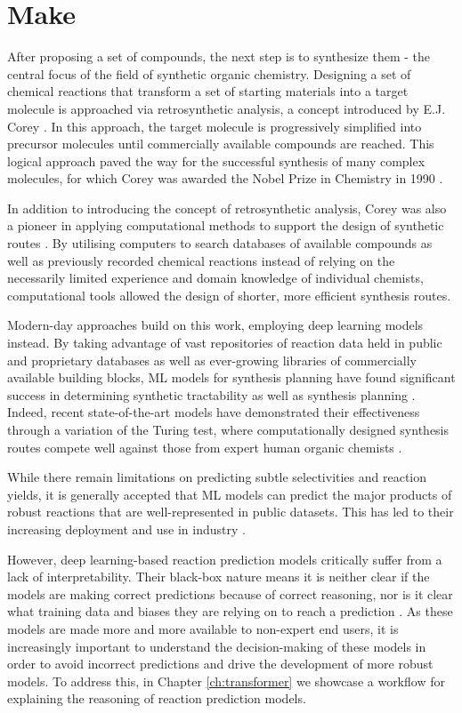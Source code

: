 \section*{Make}
After proposing a set of compounds, the next step is to synthesize them - the central focus of the field of synthetic organic chemistry. Designing a set of chemical reactions that transform a set of starting materials into a target molecule is approached via retrosynthetic analysis, a concept introduced by E.J. Corey \cite{corey1991logic}. In this approach, the target molecule is progressively simplified into precursor molecules until commercially available compounds are reached. This logical approach paved the way for the successful synthesis of many complex molecules, for which Corey was awarded the Nobel Prize in Chemistry in 1990 \cite{NobelCorey}.

In addition to introducing the concept of retrosynthetic analysis, Corey was also a pioneer in applying computational methods to support the design of synthetic routes \cite{Corey1985ComputerAssistedSynthesis}. By utilising computers to search databases of available compounds as well as previously recorded chemical reactions instead of relying on the necessarily limited experience and domain knowledge of individual chemists, computational tools allowed the design of shorter, more efficient synthesis routes.

Modern-day approaches build on this work, employing deep learning models instead. By taking advantage of vast repositories of reaction data held in public and proprietary databases as well as ever-growing libraries of commercially available building blocks, ML models for synthesis planning have found significant success in determining synthetic tractability as well as synthesis planning \cite{Coley2018}. Indeed, recent state-of-the-art models have demonstrated their effectiveness through a variation of the Turing test, where computationally designed synthesis routes compete well against those from expert human organic chemists \cite{Coley19WLDN5}.

While there remain limitations on predicting subtle selectivities and reaction yields, it is generally accepted that ML models can predict the major products of robust reactions that are well-represented in public datasets. This has led to their increasing deployment and use in industry \cite{Struble2020synthesis}.

However, deep learning-based reaction prediction models critically suffer from a lack of interpretability. Their black-box nature means it is neither clear if the models are making correct predictions because of correct reasoning, nor is it clear what training data and biases they are relying on to reach a prediction \cite{Jimenze2020XAI}. As these models are made more and more available to non-expert end users, it is increasingly important to understand the decision-making of these models in order to avoid incorrect predictions and drive the development of more robust models. To address this, in Chapter \ref{ch:transformer} we showcase a workflow for explaining the reasoning of reaction prediction models.

